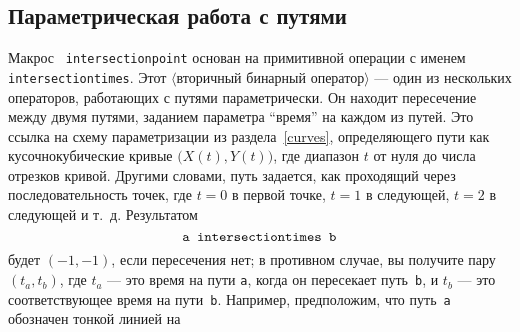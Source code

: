 \documentclass{article} %
\newcommand\invisgap{\nobreak\hskip0pt\relax}
\newcommand\tdescr[1]{$\langle$\invisgap#1\invisgap$\rangle$}
\begin{document}
\subsection{Параметрическая работа с путями}

Макрос {\tt
intersectionpoint}
основан на примитивной операции с именем {\tt
intersectiontimes}\label{Disectt}.
Этот \tdescr{вторичный бинарный оператор} --- один из нескольких операторов, 
работающих с путями параметрически. 
Он находит пересечение между двумя путями, заданием параметра ``время'' на 
каждом из путей.
Это ссылка на схему параметризации из раздела~\ref{curves}, определяющего 
пути как кусочнокубические кривые $\bigl(X(t),Y(t)\bigr)$, где диапазон $t$ 
от нуля до числа отрезков кривой.
Другими словами, путь задается, как проходящий через последовательность 
точек, где $t=0$ в первой точке, $t=1$ в следующей, $t=2$ в следующей и т.~д.
Результатом  
$$ \hbox{\tt a intersectiontimes b} $$
будет $(-1,-1)$, если пересечения нет; в противном случае, вы получите 
пару $(t_a,t_b)$, где $t_a$ --- это время на пути {\tt a}, когда он 
пересекает путь~{\tt b}, и $t_b$ --- это соответствующее время на 
пути~{\tt b}.
Например, предположим, что путь~{\tt a} обозначен тонкой линией на 
\end{document}
